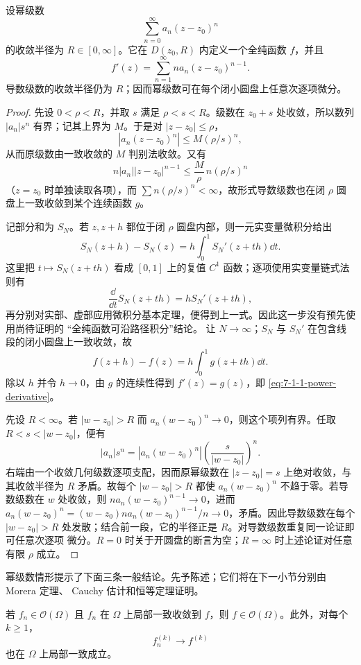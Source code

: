 \begin{theorem}[幂级数逐项微分]\label{theorem:7-1-1-1}
设幂级数
\[
  \sum_{n=0}^{\infty}a_n(z-z_0)^n
\]
的收敛半径为 $R\in[0,\infty]$。它在 $D(z_0,R)$ 内定义一个全纯函数 $f$，并且
\[
  f'(z)=\sum_{n=1}^{\infty}na_n(z-z_0)^{n-1}.
  \tag{7.1.1}\label{eq:7-1-1-power-derivative}
\]
导数级数的收敛半径仍为 $R$；因而幂级数可在每个闭小圆盘上任意次逐项微分。
\end{theorem}

\begin{proof}
先设 $0<\rho<R$，并取 $s$ 满足 $\rho<s<R$。级数在 $z_0+s$ 处收敛，所以数列
$|a_n|s^n$ 有界；记其上界为 $M$。于是对 $|z-z_0|\le\rho$，
\[
 |a_n(z-z_0)^n|\le M(\rho/s)^n,
\]
从而原级数由一致收敛的 $M$ 判别法收敛。又有
\[
 n|a_n||z-z_0|^{n-1}
 \le \frac{M}{\rho}\,n(\rho/s)^n
\]
（$z=z_0$ 时单独读取各项），而 $\sum n(\rho/s)^n<\infty$，故形式导数级数也在闭
$\rho$ 圆盘上一致收敛到某个连续函数 $g$。

记部分和为 $S_N$。若 $z,z+h$ 都位于闭 $\rho$ 圆盘内部，则一元实变量微积分给出
\[
 S_N(z+h)-S_N(z)
 =h\int_0^1S_N'(z+th)\dd t.
\]
这里把 $t\mapsto S_N(z+th)$ 看成 $[0,1]$ 上的复值 $C^1$ 函数；逐项使用实变量链式法则有
\[
 \frac{\dd}{\dd t}S_N(z+th)=hS_N'(z+th),
\]
再分别对实部、虚部应用微积分基本定理，便得到上一式。因此这一步没有预先使用尚待证明的
“全纯函数可沿路径积分”结论。
让 $N\to\infty$；$S_N$ 与 $S_N'$ 在包含线段的闭小圆盘上一致收敛，故
\[
 f(z+h)-f(z)=h\int_0^1g(z+th)\dd t.
\]
除以 $h$ 并令 $h\to0$，由 $g$ 的连续性得到 $f'(z)=g(z)$，即
\eqref{eq:7-1-1-power-derivative}。

先设 $R<\infty$。若 $|w-z_0|>R$ 而 $a_n(w-z_0)^n\to0$，则这个项列有界。任取
$R<s<|w-z_0|$，便有
\[
 |a_n|s^n
 =|a_n(w-z_0)^n|\left(\frac{s}{|w-z_0|}\right)^n.
\]
右端由一个收敛几何级数逐项支配，因而原幂级数在 $|z-z_0|=s$ 上绝对收敛，与其收敛半径为
$R$ 矛盾。故每个 $|w-z_0|>R$ 都使 $a_n(w-z_0)^n$ 不趋于零。若导数级数在 $w$ 处收敛，则
$na_n(w-z_0)^{n-1}\to0$，进而
$a_n(w-z_0)^n=(w-z_0)na_n(w-z_0)^{n-1}/n\to0$，矛盾。因此导数级数在每个
$|w-z_0|>R$ 处发散；结合前一段，它的半径正是 $R$。对导数级数重复同一论证即可任意次逐项
微分。$R=0$ 时关于开圆盘的断言为空；$R=\infty$ 时上述论证对任意有限 $\rho$ 成立。
\end{proof}

幂级数情形提示了下面三条一般结论。先予陈述；它们将在下一小节分别由 Morera 定理、
Cauchy 估计和恒等定理证明。

\begin{theorem}\label{theorem:7-1-1-2}
若 $f_n\in\mathcal O(\Omega)$ 且 $f_n$ 在 $\Omega$ 上局部一致收敛到 $f$，则
$f\in\mathcal O(\Omega)$。此外，对每个 $k\ge1$，
\[
  f_n^{(k)}\longrightarrow f^{(k)}
\]
也在 $\Omega$ 上局部一致成立。
\end{theorem}

